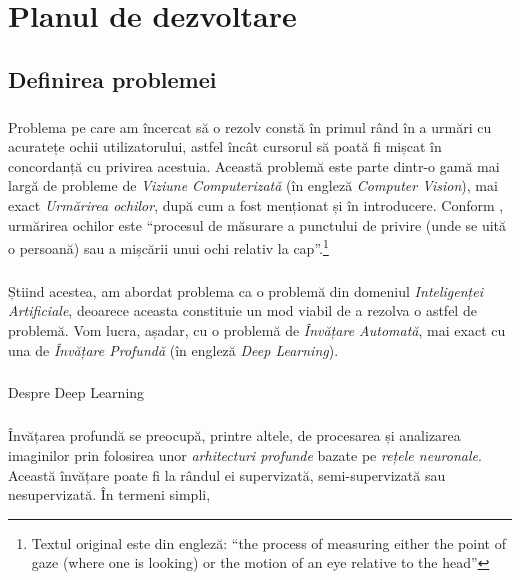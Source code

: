 \chapter{Planul de dezvoltare}

\section{Definirea problemei}

\paragraph{}
Problema pe care am încercat să o rezolv constă în primul rând în a urmări cu acuratețe ochii utilizatorului, astfel încât cursorul să poată fi mișcat în concordanță cu privirea acestuia.
Această problemă este parte dintr-o gamă mai largă de probleme de \emph{Viziune Computerizată} (în engleză \emph{Computer Vision}), mai exact \emph{Urmărirea ochilor}, după cum a fost menționat și în introducere.
Conform \cite{eye_tracking}, urmărirea ochilor este ``procesul de măsurare a punctului de privire (unde se uită o persoană) sau a mișcării unui ochi relativ la cap''.\footnote{Textul original este din engleză: ``the process of measuring either the point of gaze (where one is looking) or the motion of an eye relative to the head''}

\paragraph{}
Știind acestea, am abordat problema ca o problemă din domeniul \emph{Inteligenței Artificiale}, deoarece aceasta constituie un mod viabil de a rezolva o astfel de problemă.
Vom lucra, așadar, cu o problemă de \emph{Învățare Automată}, mai exact cu una de \emph{Învățare Profundă} (în engleză \emph{Deep Learning}).

\paragraph{}
Despre Deep Learning

\paragraph{}
Învățarea profundă se preocupă, printre altele, de procesarea și analizarea imaginilor prin folosirea unor \emph{arhitecturi profunde} bazate pe \emph{rețele neuronale}.
Această învățare poate fi la rândul ei supervizată, semi-supervizată sau nesupervizată.
În termeni simpli, 

